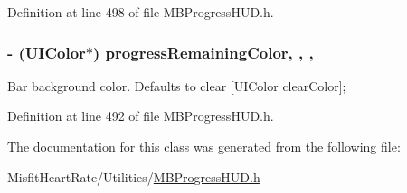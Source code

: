 Definition at line 498 of file M\+B\+Progress\+H\+U\+D.\+h.

\hypertarget{interface_m_b_bar_progress_view_a0529e715ce6e40bf0e09864ba0ca1219}{
\subsubsection[{progress\+Remaining\+Color}]{\setlength{\rightskip}{0pt plus 5cm}-\/ (U\+I\+Color$\ast$) progress\+Remaining\+Color\hspace{0.3cm}{\ttfamily [read]}, {\ttfamily [write]}, {\ttfamily [nonatomic]}, {\ttfamily [assign]}}}\label{interface_m_b_bar_progress_view_a0529e715ce6e40bf0e09864ba0ca1219}
Bar background color. Defaults to clear \mbox{[}U\+I\+Color clear\+Color\mbox{]}; 

Definition at line 492 of file M\+B\+Progress\+H\+U\+D.\+h.



The documentation for this class was generated from the following file\+:\begin{DoxyCompactItemize}
\item 
Misfit\+Heart\+Rate/\+Utilities/\hyperlink{_m_b_progress_h_u_d_8h}{M\+B\+Progress\+H\+U\+D.\+h}\end{DoxyCompactItemize}
